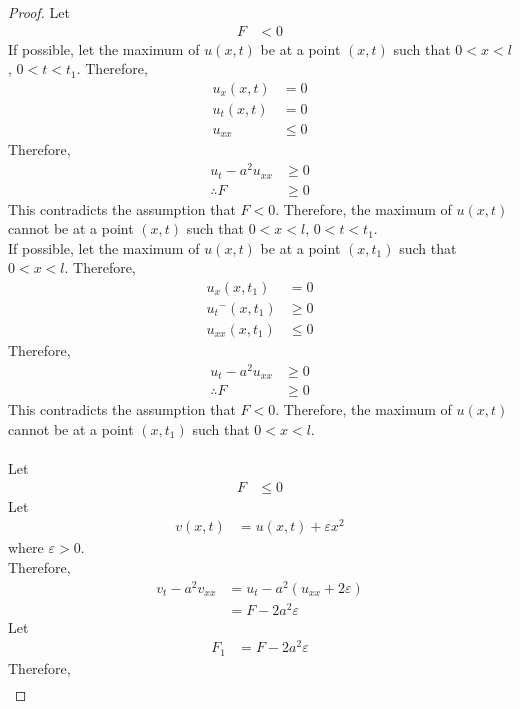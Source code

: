 \documentclass[titlepage, fleqn, a4paper, 12pt, twoside]{article}
\theoremstyle{definition}
\theoremstyle{theorem}
\begin{document}
\begin{proof}
	Let
	\begin{align*}
		F & < 0
	\end{align*}
	If possible, let the maximum of $u(x,t)$ be at a point $(x,t)$ such that $0 < x < l$, $0 < t < t_1$.
	Therefore,
	\begin{align*}
		u_x(x,t) & = 0 \\
		u_t(x,t) & = 0 \\
		u_{x x}  & \le 0
	\end{align*}
	Therefore,
	\begin{align*}
		u_t - a^2 u_{x x} & \ge 0 \\
		\therefore F      & \ge 0
	\end{align*}
	This contradicts the assumption that $F < 0$.
	Therefore, the maximum of $u(x,t)$ cannot be at a point $(x,t)$ such that $0 < x < l$, $0 < t < t_1$.\\
	If possible, let the maximum of $u(x,t)$ be at a point $(x,t_1)$ such that $0 < x < l$.
	Therefore,
	\begin{align*}
		u_x(x,t_1)     & = 0   \\
		{u_t}^-(x,t_1) & \ge 0 \\
		u_{x x}(x,t_1) & \le 0
	\end{align*}
	Therefore,
	\begin{align*}
		u_t - a^2 u_{x x} & \ge 0 \\
		\therefore F      & \ge 0
	\end{align*}
	This contradicts the assumption that $F < 0$.
	Therefore, the maximum of $u(x,t)$ cannot be at a point $(x,t_1)$ such that $0 < x < l$.\\
	~\\
	Let
	\begin{align*}
		F & \le 0
	\end{align*}
	Let
	\begin{align*}
		v(x,t) & = u(x,t) + \varepsilon x^2
	\end{align*}
	where $\varepsilon > 0$.\\
	Therefore,
	\begin{align*}
		v_t - a^2 v_{x x} & = u_t - a^2 (u_{x x} + 2 \varepsilon) \\
                                  & = F - 2 a^2 \varepsilon
	\end{align*}
	Let
	\begin{align*}
		F_1 & = F - 2 a^2 \varepsilon
	\end{align*}
	Therefore,
	\begin{align*}

\end{align*}
\end{proof}
\end{document}
